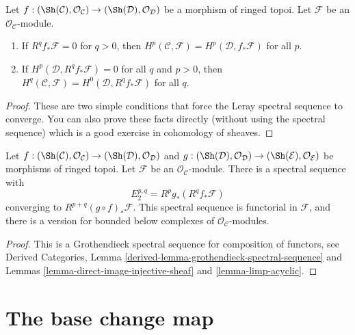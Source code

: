 \begin{lemma}
\label{lemma-apply-Leray}
Let $f : (\Sh(\mathcal{C}), \mathcal{O}_\mathcal{C}) \to
(\Sh(\mathcal{D}), \mathcal{O}_\mathcal{D})$ be a morphism of ringed topoi.
Let $\mathcal{F}$ be an $\mathcal{O}_\mathcal{C}$-module.
\begin{enumerate}
\item If $R^qf_*\mathcal{F} = 0$ for $q > 0$, then
$H^p(\mathcal{C}, \mathcal{F}) = H^p(\mathcal{D}, f_*\mathcal{F})$ for all $p$.
\item If $H^p(\mathcal{D}, R^qf_*\mathcal{F}) = 0$ for all $q$ and $p > 0$,
then $H^q(\mathcal{C}, \mathcal{F}) = H^0(\mathcal{D}, R^qf_*\mathcal{F})$
for all $q$.
\end{enumerate}
\end{lemma}

\begin{proof}
These are two simple conditions that force the Leray spectral sequence to
converge. You can also prove these facts directly (without using the
spectral sequence) which is a good exercise in cohomology of sheaves.
\end{proof}

\begin{lemma}
\label{lemma-relative-Leray}
Let
$f : (\Sh(\mathcal{C}), \mathcal{O}_\mathcal{C}) \to
(\Sh(\mathcal{D}), \mathcal{O}_\mathcal{D})$
and
$g : (\Sh(\mathcal{D}), \mathcal{O}_\mathcal{D}) \to
(\Sh(\mathcal{E}), \mathcal{O}_\mathcal{E})$
be morphisms of ringed topoi.
Let $\mathcal{F}$ be an $\mathcal{O}_\mathcal{C}$-module.
There is a spectral sequence with
$$
E_2^{p, q} = R^pg_*(R^qf_*\mathcal{F})
$$
converging to $R^{p + q}(g \circ f)_*\mathcal{F}$.
This spectral sequence is functorial in $\mathcal{F}$, and there
is a version for bounded below complexes of $\mathcal{O}_\mathcal{C}$-modules.
\end{lemma}

\begin{proof}
This is a Grothendieck spectral sequence for composition of functors, see
Derived Categories, Lemma \ref{derived-lemma-grothendieck-spectral-sequence}
and
Lemmas \ref{lemma-direct-image-injective-sheaf} and
\ref{lemma-limp-acyclic}.
\end{proof}







\section{The base change map}
\label{section-base-change-map}

